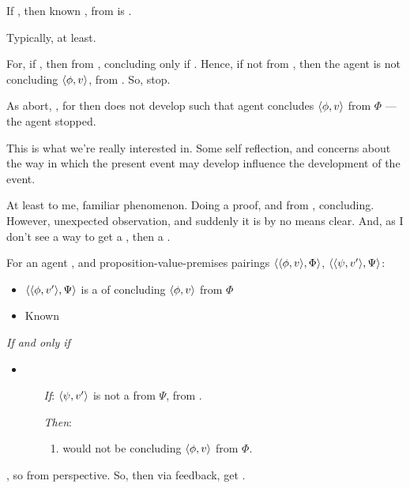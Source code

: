\begin{note}
  \begin{proposition}[Feedback]
    If \requ{}, then known \fc{}, from \agpe{} is \curb{}.
    \begin{argument}
      Typically, at least.

      For, if \requ{}, then from \agpe{}, concluding only if \fc{}.
      Hence, if not \fc{} from \agpe{}, then the agent is not concluding \(\langle \phi, v \rangle\), from .
      So, stop.

      As abort, \curb{}, for then does not develop such that agent concludes \(\langle \phi, v \rangle\) from \(\Phi\) --- the agent stopped.
    \end{argument}
  \end{proposition}

  This is what we're really interested in.
  Some self reflection, and concerns about the way in which the present event may develop influence the development of the event.

  At least to me, familiar phenomenon.
  Doing a proof, and from , concluding.
  However, unexpected observation, and suddenly it is by no means clear.
  And, as I don't see a way to get a \fc{}, then a \curb{}.
\end{note}

\begin{note}
  \begin{proposition}
    For an agent \vAgent{}, and proposition-value-premises pairings \(\langle \langle \phi, v \rangle, \Phi \rangle\), \(\langle \langle \psi, v' \rangle, \Psi \rangle\):

    \begin{itemize}
    \item
      \(\langle \langle \phi, v' \rangle, \Psi \rangle\) is a \requ{} of \vAgent{} concluding \(\langle \phi, v \rangle\) from \(\Phi\)
    \item
      Known
    \end{itemize}

    \emph{If and only if}

    \begin{itemize}
    \item
        \begin{enumerate}
        \item[\emph{If}:]
          \(\langle \psi, v' \rangle\) is not a \fc{} from \(\Psi\), from .
        \item[\emph{Then}:]
          \begin{enumerate}[label=\alph*., ref=(\alph*), resume]
          \item
            \label{def:curb:fail}
            \vAgent{} would not be concluding \(\langle \phi, v \rangle\) from \(\Phi\).
          \end{enumerate}
      \end{enumerate}
    \end{itemize}
    \begin{argument}
      \requ{}, so \curb{} from perspective.
      So, then via feedback, get \curb{}.
    \end{argument}
  \end{proposition}
\end{note}



